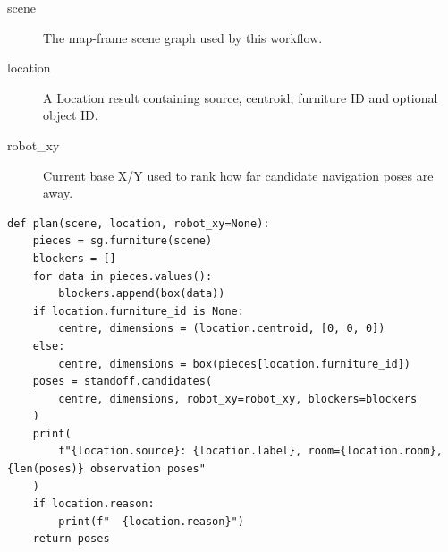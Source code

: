 \documentclass[11pt,a4paper]{book}
\begin{document}
\begin{description}
\item[scene] The map-frame scene graph used by this workflow.
\item[location] A Location result containing source, centroid, furniture ID and optional object ID.
\item[robot\_xy] Current base X/Y used to rank how far candidate navigation poses are away.
\end{description}

\begin{lstlisting}[firstnumber=40]
def plan(scene, location, robot_xy=None):
    pieces = sg.furniture(scene)
    blockers = []
    for data in pieces.values():
        blockers.append(box(data))
    if location.furniture_id is None:
        centre, dimensions = (location.centroid, [0, 0, 0])
    else:
        centre, dimensions = box(pieces[location.furniture_id])
    poses = standoff.candidates(
        centre, dimensions, robot_xy=robot_xy, blockers=blockers
    )
    print(
        f"{location.source}: {location.label}, room={location.room}, {len(poses)} observation poses"
    )
    if location.reason:
        print(f"  {location.reason}")
    return poses


\end{lstlisting}
\end{document}
